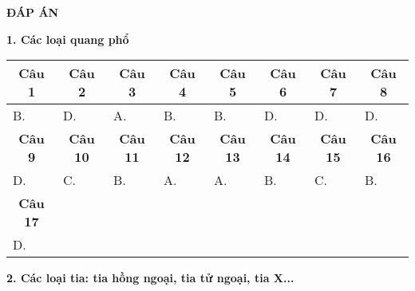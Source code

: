 \begin{center}
	\textbf{ĐÁP ÁN}
	
\end{center}

\textbf{1. Các loại quang phổ}

\begin{longtable}[\textwidth]{|p{}|p{}|p{}|p{}|p{}|p{}|p{}|p{}|}
	\hline%
	\multicolumn{1}{|c}{\textbf{Câu 1}} & \multicolumn{1}{|c|}{\textbf{Câu 2}} & \multicolumn{1}{c|}{\textbf{Câu 3}} &
	\multicolumn{1}{c|}{\textbf{Câu 4}} &
	\multicolumn{1}{c|}{\textbf{Câu 5}} &
	\multicolumn{1}{c|}{\textbf{Câu 6}} &
	\multicolumn{1}{c|}{\textbf{Câu 7}} &
	\multicolumn{1}{c|}{\textbf{Câu 8}}\\
	\hline
	B. &D. &A. &B. &B. &D. &D. &D.\\
	\hline
	
	\multicolumn{1}{|c|}{\textbf{Câu 9}} & \multicolumn{1}{c|}{\textbf{Câu 10}} & \multicolumn{1}{c|}{\textbf{Câu 11}} &
	\multicolumn{1}{c|}{\textbf{Câu 12}} &
	\multicolumn{1}{c|}{\textbf{Câu 13}} &
	\multicolumn{1}{c|}{\textbf{Câu 14}} &
	\multicolumn{1}{c|}{\textbf{Câu 15}} &
	\multicolumn{1}{c|}{\textbf{Câu 16}} \\
	\hline
	D. &C. &B. &A. &A. &B. &C. &B.\\
	\hline	
	
	\multicolumn{1}{|c|}{\textbf{Câu 17}} & \multicolumn{1}{c|}{\textbf{}} & \multicolumn{1}{c|}{\textbf{}} &
	\multicolumn{1}{c|}{\textbf{}} &
	\multicolumn{1}{c|}{\textbf{}} &
	\multicolumn{1}{c|}{\textbf{}} &
	\multicolumn{1}{c|}{\textbf{}} &
	\multicolumn{1}{c|}{} \\
	\hline
	D. & & & & & & &\\
	\hline	
	
	
\end{longtable}


\textbf{2. Các loại tia: tia hồng ngoại, tia tử ngoại, tia X...}


